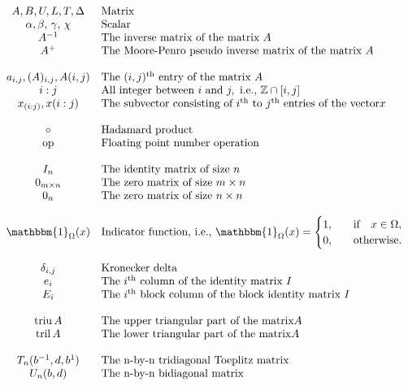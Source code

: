 \documentclass[11pt]{article}
\newcommand{\triu}{\mathop{\mathrm{triu}}}
\newcommand{\tril}{\mathop{\mathrm{tril}}}
\begin{document}
\begin{align*}
    \begin{array}{cl}
    A, B, U, L, T, \Delta & \text {Matrix } \\
    \alpha, \beta,\, \gamma,\, \chi & \text {Scalar } \\
    A^{-1} & \text {The inverse matrix of the matrix } A \\
    A^{+} & \text {The Moore-Penro pseudo inverse matrix of the matrix } A\\
    \\
    a_{i,j}, (A)_{i,j}, A(i,j) & \text {The } (i, j)^{\text{th}} \text{ entry of the matrix }A \\
    i:j & \text{All integer between }i \text{ and }j, \text{ i.e., } \mathbb{Z}\cap[i,j]\\
    x_{(i:j)}, x(i:j) & \text{The subvector consisting of } i^{\text{th}} \text{ to } j^{\text{th}} \text{ entries of the vector}x\\
    \\
    \circ & \text{Hadamard product}\\
    \text{op} & \text{Floating point number operation}\\
    \\
    I_{n} & \text{The identity matrix of size }n\\
    0_{m \times n} & \text{The zero matrix of size }m \times n\\
    0_{n} & \text{The zero matrix of size }n \times n\\
    \\
    \mathbbm{1}_{\Omega}(x) & \text{Indicator function, i.e., }\mathbbm{1}_{\Omega}(x) = 
        \begin{cases}
            1\qc &  \qif* x \in \Omega, \\ 
            0\qc &  \text{otherwise}.
        \end{cases}\\
    \\
    \delta_{i,j} & \text{Kronecker delta}\\
    e_i & \text{The } i^{\text{th}} \text{ column of the identity matrix }I\\
    E_i & \text{The } i^{\text{th}} \text{ block column of the block identity matrix }I\\
    \\
    \triu{A} & \text{The upper triangular part of the matrix} A\\
    \tril{A} & \text{The lower triangular part of the matrix} A\\
    \\
    T_{n}(b^{-1}, d, b^{1}) & \text{The n-by-n tridiagonal Toeplitz matrix}\\
    U_{n}(b,d) & \text{The n-by-n bidiagonal matrix}\\
    \end{array}
\end{align*}
\end{document}
